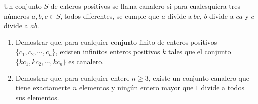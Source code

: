 Un conjunto $S$ de enteros positivos se llama canalero si para cualesquiera tres números $a,b,c \in S$, todos diferentes, se cumple que $a$ divide a $bc$, $b$ divide a $ca$ y $c$ divide a $ab$.
\begin{enumerate}
   \item  Demostrar que, para cualquier conjunto finito de enteros positivos $\{c_1,c_2, \cdots , c_n\}$, existen infinitos enteros positivos $k$ tales que el conjunto $\{ kc_1, kc_2, \cdots , kc_n \}$ es canalero.
   \item  Demostrar que, para cualquier entero $n \geq 3$, existe un conjunto canalero que tiene exactamente $n$ elementos y ningún entero mayor que $1$ divide a todos sus elementos.
 \end{enumerate} 
